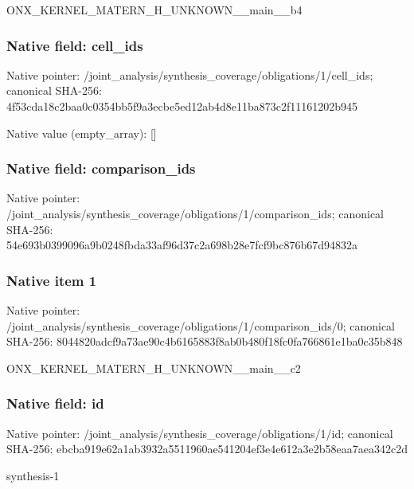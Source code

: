 \documentclass[10pt,a4paper]{article}
\begin{document}
\begingroup\raggedright\sloppy ONX\_\allowbreak{}KERNEL\_\allowbreak{}MATERN\_\allowbreak{}H\_\allowbreak{}UNKNOWN\_\allowbreak{}\_\allowbreak{}main\_\allowbreak{}\_\allowbreak{}b4\par\endgroup

\subsubsection{Native field: cell\_\allowbreak{}ids}
Native pointer: /joint\_\allowbreak{}analysis/synthesis\_\allowbreak{}coverage/obligations/1/cell\_\allowbreak{}ids; canonical SHA-256: 4f53cda18c2baa0c0354bb5f9a3ecbe5ed12ab4d8e11ba873c2f11161202b945

Native value (empty\_\allowbreak{}array): []

\subsubsection{Native field: comparison\_\allowbreak{}ids}
Native pointer: /joint\_\allowbreak{}analysis/synthesis\_\allowbreak{}coverage/obligations/1/comparison\_\allowbreak{}ids; canonical SHA-256: 54e693b0399096a9b0248fbda33af96d37c2a698b28e7fcf9bc876b67d94832a

\subsubsection{Native item 1}
Native pointer: /joint\_\allowbreak{}analysis/synthesis\_\allowbreak{}coverage/obligations/1/comparison\_\allowbreak{}ids/0; canonical SHA-256: 8044820adcf9a73ae90c4b6165883f8ab0b480f18fc0fa766861e1ba0c35b848

\begingroup\raggedright\sloppy ONX\_\allowbreak{}KERNEL\_\allowbreak{}MATERN\_\allowbreak{}H\_\allowbreak{}UNKNOWN\_\allowbreak{}\_\allowbreak{}main\_\allowbreak{}\_\allowbreak{}c2\par\endgroup

\subsubsection{Native field: id}
Native pointer: /joint\_\allowbreak{}analysis/synthesis\_\allowbreak{}coverage/obligations/1/id; canonical SHA-256: ebcba919e62a1ab3932a5511960ae541204ef3e4e612a3e2b58eaa7aea342c2d

\begingroup\raggedright\sloppy synthesis-1\par\endgroup
\end{document}
